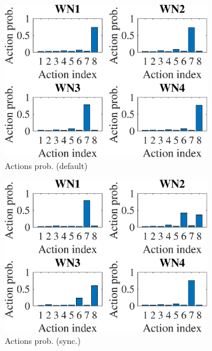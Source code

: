 \documentclass[preprint,12pt]{article}
\begin{document}
\begin{figure}[h!]
	\centering
	\begin{subfigure}[b]{.33\textwidth}
		\includegraphics[width=\textwidth]{images/actions_probability_TS}
		\caption{Actions prob. (default)}\label{fig:actions_probability_TS}
	\end{subfigure}
	\begin{subfigure}[b]{.33\textwidth}
		\includegraphics[width=\textwidth]{images/actions_probability_OTS}
		\caption{Actions prob. (sync.)}\label{fig:actions_probability_OTS}
	\end{subfigure}\\
	\begin{subfigure}[b]{.33\textwidth}

\end{subfigure}
\end{figure}
\end{document}
